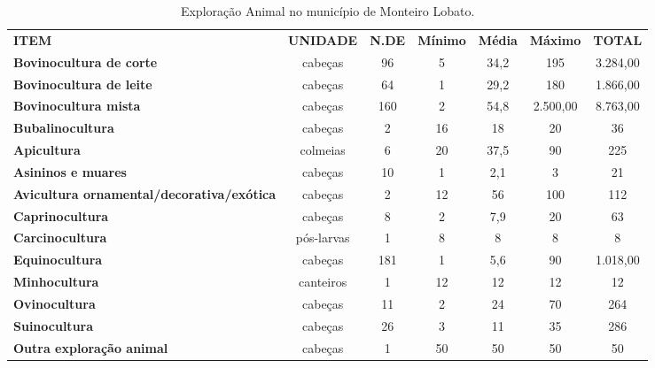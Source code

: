 \begin{table}[htbp]
  \centering
  \caption{Exploração Animal no município de Monteiro Lobato.}
    \begin{tabular}{p{12.145em}|c|c|c|c|c|c}
    \rowcolor[rgb]{ .969,  .588,  .275} \textcolor[rgb]{ 1,  1,  1}{\textbf{ITEM}} & \textcolor[rgb]{ 1,  1,  1}{\textbf{UNIDADE}} & \textcolor[rgb]{ 1,  1,  1}{\textbf{N.DE}} & \textcolor[rgb]{ 1,  1,  1}{\textbf{Mínimo}} & \textcolor[rgb]{ 1,  1,  1}{\textbf{Média}} & \textcolor[rgb]{ 1,  1,  1}{\textbf{Máximo}} & \textcolor[rgb]{ 1,  1,  1}{\textbf{TOTAL}} \\
    \rowcolor[rgb]{ .984,  .831,  .706} \textbf{Bovinocultura de corte} & cabeças & 96    & 5     & 34,2  & 195   & 3.284,00 \\
    \rowcolor[rgb]{ .992,  .914,  .851} \textbf{Bovinocultura de leite} & cabeças & 64    & 1     & 29,2  & 180   & 1.866,00 \\
    \rowcolor[rgb]{ .984,  .831,  .706} \textbf{Bovinocultura mista} & cabeças & 160   & 2     & 54,8  & 2.500,00 & 8.763,00 \\
    \rowcolor[rgb]{ .992,  .914,  .851} \textbf{Bubalinocultura} & cabeças & 2     & 16    & 18    & 20    & 36 \\
    \rowcolor[rgb]{ .984,  .831,  .706} \textbf{Apicultura} & colmeias & 6     & 20    & 37,5  & 90    & 225 \\
    \rowcolor[rgb]{ .992,  .914,  .851} \textbf{Asininos e muares} & cabeças & 10    & 1     & 2,1   & 3     & 21 \\
    \rowcolor[rgb]{ .984,  .831,  .706} \textbf{Avicultura ornamental/decorativa/exótica} & cabeças & 2     & 12    & 56    & 100   & 112 \\
    \rowcolor[rgb]{ .992,  .914,  .851} \textbf{Caprinocultura} & cabeças & 8     & 2     & 7,9   & 20    & 63 \\
    \rowcolor[rgb]{ .984,  .831,  .706} \textbf{Carcinocultura} & pós-larvas & 1     & 8     & 8     & 8     & 8 \\
    \rowcolor[rgb]{ .992,  .914,  .851} \textbf{Equinocultura} & cabeças & 181   & 1     & 5,6   & 90    & 1.018,00 \\
    \rowcolor[rgb]{ .984,  .831,  .706} \textbf{Minhocultura} & canteiros & 1     & 12    & 12    & 12    & 12 \\
    \rowcolor[rgb]{ .992,  .914,  .851} \textbf{Ovinocultura} & cabeças & 11    & 2     & 24    & 70    & 264 \\
    \rowcolor[rgb]{ .984,  .831,  .706} \textbf{Suinocultura} & cabeças & 26    & 3     & 11    & 35    & 286 \\
    \rowcolor[rgb]{ .992,  .914,  .851} \textbf{Outra exploração animal} & cabeças & 1     & 50    & 50    & 50    & 50 \\
    \end{tabular}%
  \label{tab:exploracao_animal}%
\end{table}%
